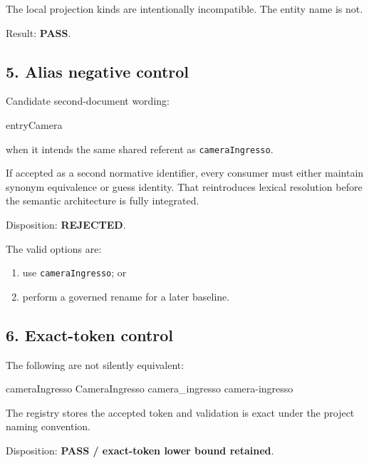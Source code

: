 \documentclass[
  10pt,
  a4paper,
]{article}
\newenvironment{Shaded}{}{}
\newcommand{\NormalTok}[1]{#1}
\providecommand{\tightlist}{%
  \setlength{\itemsep}{0pt}\setlength{\parskip}{0pt}}
\begin{document}
The local projection kinds are intentionally incompatible. The entity
name is not.

Result: \textbf{PASS}.

\subsection{5. Alias negative control}\label{alias-negative-control}

Candidate second-document wording:

\begin{Shaded}
\begin{Highlighting}[]
\NormalTok{entryCamera}
\end{Highlighting}
\end{Shaded}

when it intends the same shared referent as \texttt{cameraIngresso}.

If accepted as a second normative identifier, every consumer must either
maintain synonym equivalence or guess identity. That reintroduces
lexical resolution before the semantic architecture is fully integrated.

Disposition: \textbf{REJECTED}.

The valid options are:

\begin{enumerate}
\def\labelenumi{\arabic{enumi}.}
\tightlist
\item
  use \texttt{cameraIngresso}; or
\item
  perform a governed rename for a later baseline.
\end{enumerate}

\subsection{6. Exact-token control}\label{exact-token-control}

The following are not silently equivalent:

\begin{Shaded}
\begin{Highlighting}[]
\NormalTok{cameraIngresso}
\NormalTok{CameraIngresso}
\NormalTok{camera\_ingresso}
\NormalTok{camera{-}ingresso}
\end{Highlighting}
\end{Shaded}

The registry stores the accepted token and validation is exact under the
project naming convention.

Disposition: \textbf{PASS / exact-token lower bound retained}.
\end{document}
